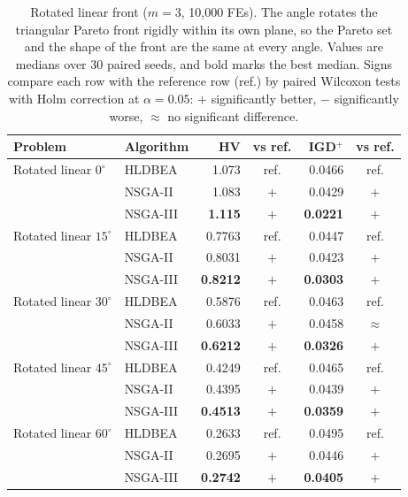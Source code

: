 \begin{table}[!htbp]
\centering
\caption{Rotated linear front ($m=3$, 10{,}000 FEs). The angle rotates the triangular Pareto front rigidly within its own plane, so the Pareto set and the shape of the front are the same at every angle. Values are medians over 30 paired seeds, and bold marks the best median. Signs compare each row with the reference row (ref.) by paired Wilcoxon tests with Holm correction at $\alpha=0.05$: $+$ significantly better, $-$ significantly worse, $\approx$ no significant difference.}
\label{tab:rotation}
\small
\setlength{\tabcolsep}{3pt}
\begin{tabular}{|l|l|r|c|r|c|}
\hline
\textbf{Problem} & \textbf{Algorithm} & \textbf{HV} & \textbf{vs ref.} & \textbf{IGD$^+$} & \textbf{vs ref.} \\ \hline
Rotated linear $0^\circ$ & HLDBEA & 1.073 & ref. & 0.0466 & ref. \\
 & NSGA-II & 1.083 & $+$ & 0.0429 & $+$ \\
 & NSGA-III & \textbf{1.115} & $+$ & \textbf{0.0221} & $+$ \\
\hline
Rotated linear $15^\circ$ & HLDBEA & 0.7763 & ref. & 0.0447 & ref. \\
 & NSGA-II & 0.8031 & $+$ & 0.0423 & $+$ \\
 & NSGA-III & \textbf{0.8212} & $+$ & \textbf{0.0303} & $+$ \\
\hline
Rotated linear $30^\circ$ & HLDBEA & 0.5876 & ref. & 0.0463 & ref. \\
 & NSGA-II & 0.6033 & $+$ & 0.0458 & $\approx$ \\
 & NSGA-III & \textbf{0.6212} & $+$ & \textbf{0.0326} & $+$ \\
\hline
Rotated linear $45^\circ$ & HLDBEA & 0.4249 & ref. & 0.0465 & ref. \\
 & NSGA-II & 0.4395 & $+$ & 0.0439 & $+$ \\
 & NSGA-III & \textbf{0.4513} & $+$ & \textbf{0.0359} & $+$ \\
\hline
Rotated linear $60^\circ$ & HLDBEA & 0.2633 & ref. & 0.0495 & ref. \\
 & NSGA-II & 0.2695 & $+$ & 0.0446 & $+$ \\
 & NSGA-III & \textbf{0.2742} & $+$ & \textbf{0.0405} & $+$ \\
\hline
\end{tabular}
\end{table}
